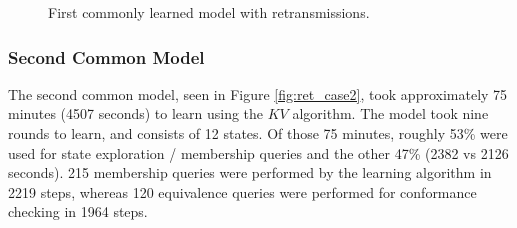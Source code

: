 \begin{figure}[ht]
	\vspace*{\fill}
	\noindent
	\hspace*{-2.1\oddsidemargin}%
	\caption{First commonly learned model with retransmissions.}
	\label{fig:ret_case1}
	\vspace*{\fill}
\end{figure}
\newpage

\subsubsection*{Second Common Model}

The second common model, seen in Figure \ref{fig:ret_case2}, took approximately 75 minutes (4507 seconds) to learn using the $KV$ algorithm. The model took nine rounds to learn, and consists of 12 states. Of those 75 minutes, roughly 53\% were used for state exploration / membership queries and the other 47\% (2382 vs 2126 seconds). 215 membership queries were performed by the learning algorithm in 2219 steps, whereas 120 equivalence queries were performed for conformance checking in 1964 steps. 

